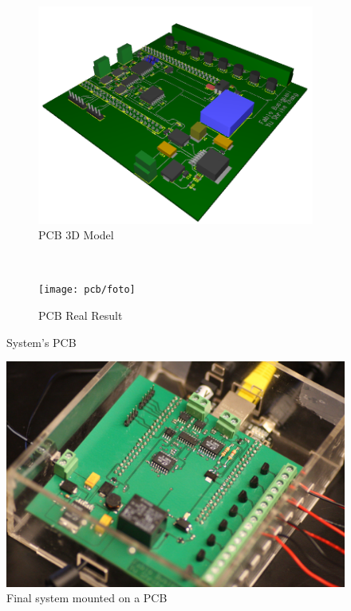 \documentclass[12pt,a4paper,twoside]{article}
\begin{document}
	
	
	
	\begin{figure}
		\centering
		\begin{subfigure}[h]{0.5\textwidth}
			\includegraphics[width=\textwidth]{pcb/3D-circuit-green}
			\caption{PCB 3D Model}
			\label{fig:3dmodel}
		\end{subfigure}%
	~
		\begin{subfigure}[h]{0.5\textwidth}
			\texttt{[image: pcb/foto]}
			\caption{PCB Real Result}
			\label{fig:tiger}
		\end{subfigure}
			\caption{System's PCB}\label{fig:PCB}
	\end{figure}
	
	\begin{figure}[h]
		\centering
		\includegraphics[width = \textwidth]{circuitfinisched}
		\caption{Final system mounted on a PCB}
		\label{Fig:finalcircuit}
	\end{figure}
	\clearpage
\end{document}
